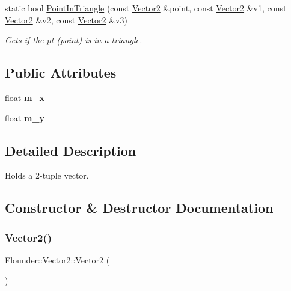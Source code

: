 \begin{DoxyCompactItemize}
static bool \hyperlink{class_flounder_1_1_vector2_ad3080e41d0c61bec0d56ded7f67a98bc}{Point\+In\+Triangle} (const \hyperlink{class_flounder_1_1_vector2}{Vector2} \&point, const \hyperlink{class_flounder_1_1_vector2}{Vector2} \&v1, const \hyperlink{class_flounder_1_1_vector2}{Vector2} \&v2, const \hyperlink{class_flounder_1_1_vector2}{Vector2} \&v3)
\begin{DoxyCompactList}\small\item\em Gets if the pt (point) is in a triangle. \end{DoxyCompactList}\end{DoxyCompactItemize}
\subsection*{Public Attributes}
\begin{DoxyCompactItemize}
\item 
\mbox{\label{class_flounder_1_1_vector2_a7d1e0827ad182acd17f41fd4077b5bb4}} 
float {\bfseries m\+\_\+x}
\item 
\mbox{\label{class_flounder_1_1_vector2_a7b81a14291dbd50181d9c55fb5e50ccc}} 
float {\bfseries m\+\_\+y}
\end{DoxyCompactItemize}


\subsection{Detailed Description}
Holds a 2-\/tuple vector. 



\subsection{Constructor \& Destructor Documentation}
\mbox{\label{class_flounder_1_1_vector2_a1134bd3edafd519821915ec156746d2b}} 
\subsubsection{\texorpdfstring{Vector2()}{Vector2()}\hspace{0.1cm}{\footnotesize\ttfamily [1/4]}}
{\footnotesize\ttfamily Flounder\+::\+Vector2\+::\+Vector2 (\begin{DoxyParamCaption}{ }\end{DoxyParamCaption})}



